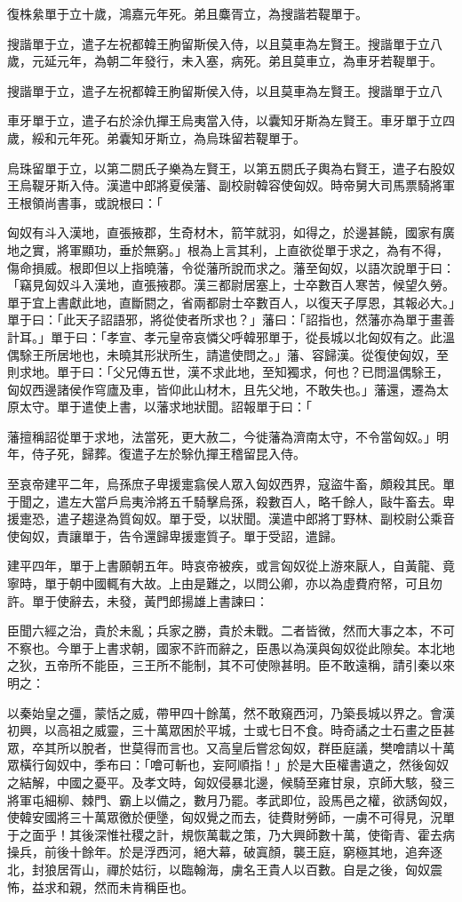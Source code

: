 \begin{pinyinscope}
復株絫單于立十歲，鴻嘉元年死。弟且麋胥立，為搜諧若鞮單于。

搜諧單于立，遣子左祝都韓王朐留斯侯入侍，以且莫車為左賢王。搜諧單于立八歲，元延元年，為朝二年發行，未入塞，病死。弟且莫車立，為車牙若鞮單于。

搜諧單于立，遣子左祝都韓王朐留斯侯入侍，以且莫車為左賢王。搜諧單于立八

車牙單于立，遣子右於涂仇撣王烏夷當入侍，以囊知牙斯為左賢王。車牙單于立四歲，綏和元年死。弟囊知牙斯立，為烏珠留若鞮單于。

烏珠留單于立，以第二閼氏子樂為左賢王，以第五閼氏子輿為右賢王，遣子右股奴王烏鞮牙斯入侍。漢遣中郎將夏侯藩、副校尉韓容使匈奴。時帝舅大司馬票騎將軍王根領尚書事，或說根曰：「

匈奴有斗入漢地，直張掖郡，生奇材木，箭竿就羽，如得之，於邊甚饒，國家有廣地之實，將軍顯功，垂於無窮。」根為上言其利，上直欲從單于求之，為有不得，傷命損威。根即但以上指曉藩，令從藩所說而求之。藩至匈奴，以語次說單于曰：「竊見匈奴斗入漢地，直張掖郡。漢三都尉居塞上，士卒數百人寒苦，候望久勞。單于宜上書獻此地，直斷閼之，省兩都尉士卒數百人，以復天子厚恩，其報必大。」單于曰：「此天子詔語邪，將從使者所求也？」藩曰：「詔指也，然藩亦為單于畫善計耳。」單于曰：「孝宣、孝元皇帝哀憐父呼韓邪單于，從長城以北匈奴有之。此溫偶駼王所居地也，未曉其形狀所生，請遣使問之。」藩、容歸漢。從復使匈奴，至則求地。單于曰：「父兄傳五世，漢不求此地，至知獨求，何也？已問溫偶駼王，匈奴西邊諸侯作穹廬及車，皆仰此山材木，且先父地，不敢失也。」藩還，遷為太原太守。單于遣使上書，以藩求地狀聞。詔報單于曰：「

藩擅稱詔從單于求地，法當死，更大赦二，今徙藩為濟南太守，不令當匈奴。」明年，侍子死，歸葬。復遣子左於駼仇撣王稽留昆入侍。

至哀帝建平二年，烏孫庶子卑援疐翕侯人眾入匈奴西界，寇盜牛畜，頗殺其民。單于聞之，遣左大當戶烏夷泠將五千騎擊烏孫，殺數百人，略千餘人，敺牛畜去。卑援疐恐，遣子趨逯為質匈奴。單于受，以狀聞。漢遣中郎將丁野林、副校尉公乘音使匈奴，責讓單于，告令還歸卑援疐質子。單于受詔，遣歸。

建平四年，單于上書願朝五年。時哀帝被疾，或言匈奴從上游來厭人，自黃龍、竟寧時，單于朝中國輒有大故。上由是難之，以問公卿，亦以為虛費府帑，可且勿許。單于使辭去，未發，黃門郎揚雄上書諫曰：

臣聞六經之治，貴於未亂；兵家之勝，貴於未戰。二者皆微，然而大事之本，不可不察也。今單于上書求朝，國家不許而辭之，臣愚以為漢與匈奴從此隙矣。本北地之狄，五帝所不能臣，三王所不能制，其不可使隙甚明。臣不敢遠稱，請引秦以來明之：

以秦始皇之彊，蒙恬之威，帶甲四十餘萬，然不敢窺西河，乃築長城以界之。會漢初興，以高祖之威靈，三十萬眾困於平城，士或七日不食。時奇譎之士石畫之臣甚眾，卒其所以脫者，世莫得而言也。又高皇后嘗忿匈奴，群臣庭議，樊噲請以十萬眾橫行匈奴中，季布曰：「噲可斬也，妄阿順指！」於是大臣權書遺之，然後匈奴之結解，中國之憂平。及孝文時，匈奴侵暴北邊，候騎至雍甘泉，京師大駭，發三將軍屯細柳、棘門、霸上以備之，數月乃罷。孝武即位，設馬邑之權，欲誘匈奴，使韓安國將三十萬眾徼於便墬，匈奴覺之而去，徒費財勞師，一虜不可得見，況單于之面乎！其後深惟社稷之計，規恢萬載之策，乃大興師數十萬，使衛青、霍去病操兵，前後十餘年。於是浮西河，絕大幕，破寘顏，襲王庭，窮極其地，追奔逐北，封狼居胥山，禪於姑衍，以臨翰海，虜名王貴人以百數。自是之後，匈奴震怖，益求和親，然而未肯稱臣也。


\end{pinyinscope}
